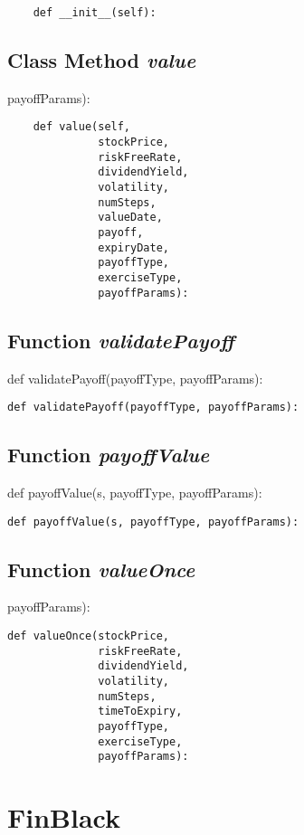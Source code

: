 \documentclass[twoside,11pt]{book}
\begin{document}
\begin{lstlisting}
    def __init__(self):
\end{lstlisting}

\subsection{Class Method {\it value}}
payoffParams):

\begin{lstlisting}
    def value(self,
              stockPrice,
              riskFreeRate,
              dividendYield,
              volatility,
              numSteps,
              valueDate,
              payoff,
              expiryDate,
              payoffType,
              exerciseType,
              payoffParams):
\end{lstlisting}

\subsection{Function {\it validatePayoff}}
def validatePayoff(payoffType, payoffParams):

\begin{lstlisting}
def validatePayoff(payoffType, payoffParams):
\end{lstlisting}

\subsection{Function {\it payoffValue}}
def payoffValue(s, payoffType, payoffParams):

\begin{lstlisting}
def payoffValue(s, payoffType, payoffParams):
\end{lstlisting}

\subsection{Function {\it valueOnce}}
payoffParams):

\begin{lstlisting}
def valueOnce(stockPrice,
              riskFreeRate,
              dividendYield,
              volatility,
              numSteps,
              timeToExpiry,
              payoffType,
              exerciseType,
              payoffParams):
\end{lstlisting}

\newpage
\section{FinBlack}
\end{document}
